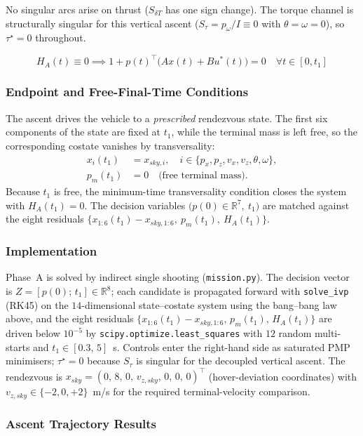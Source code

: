 \documentclass[letterpaper, 10 pt, conference]{ieeeconf}
\begin{document}
No singular arcs arise on thrust ($S_{\delta T}$ has one sign change). The torque channel is structurally singular for this vertical ascent ($S_\tau=p_\omega/I\equiv0$ with $\theta=\omega=0$), so $\tau^\star=0$ throughout.

\[H_A(t) \equiv 0 \implies 1 + p(t)^\top \big(Ax(t) + Bu^*(t)\big) = 0 \quad \forall t \in [0, t_1]\]

\subsubsection*{Endpoint and Free-Final-Time Conditions}

The ascent drives the vehicle to a \emph{prescribed} rendezvous state. The first six components of the state are fixed at $t_1$, while the terminal mass is left free, so the corresponding costate vanishes by transversality:
\[
\begin{aligned}
x_i(t_1) &= x_{sky,i}, \quad i \in \{p_x, p_z, v_x, v_z, \theta, \omega\}, \\
p_m(t_1) &= 0 \quad \text{(free terminal mass)}.
\end{aligned}
\]
Because $t_1$ is free, the minimum-time transversality condition closes the system with $H_A(t_1)=0$. The decision variables $\big(p(0)\in\mathbb{R}^7,\ t_1\big)$ are matched against the eight residuals $\{x_{1:6}(t_1)-x_{sky,1:6},\ p_m(t_1),\ H_A(t_1)\}$.

\subsubsection*{Implementation}

Phase~A is solved by indirect single shooting (\texttt{mission.py}). The decision vector is $Z=[p(0);\,t_1]\in\mathbb{R}^8$; each candidate is propagated forward with \texttt{solve\_ivp} (RK45) on the $14$-dimensional state--costate system using the bang--bang law above, and the eight residuals $\{x_{1:6}(t_1)-x_{sky,1:6},\,p_m(t_1),\,H_A(t_1)\}$ are driven below $10^{-5}$ by \texttt{scipy.optimize.least\_squares} with $12$ random multi-starts and $t_1\in[0.3,\,5]$~s. Controls enter the right-hand side as saturated PMP minimisers; $\tau^\star=0$ because $S_\tau$ is singular for the decoupled vertical ascent. The rendezvous is $x_{sky}=(0,\,8,\,0,\,v_{z,sky},\,0,\,0,\,0)^\top$ (hover-deviation coordinates) with $v_{z,sky}\in\{-2,0,+2\}$~m/s for the required terminal-velocity comparison.

\subsubsection*{Ascent Trajectory Results}
\end{document}
